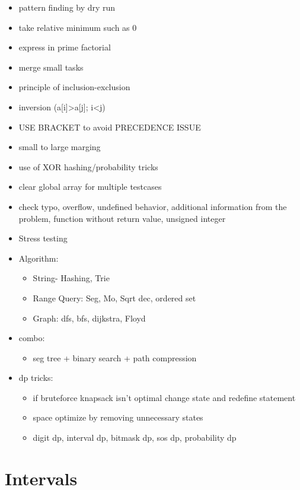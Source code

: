 \begin{itemize}
    \item pattern finding by dry run
    \item take relative minimum such as 0
    \item express in prime factorial
    \item merge small tasks 
    \item principle of inclusion-exclusion
    \item inversion (a[i]>a[j]; i<j)
    \item USE BRACKET to avoid PRECEDENCE ISSUE
    \item small to large marging
    \item use of XOR hashing/probability tricks
    \item clear global array for multiple testcases
    \item check typo, overflow, undefined behavior, additional information from the problem, function without return value, unsigned integer 
    \item Stress testing
    \item Algorithm:
    \begin{itemize}
        \item String- Hashing, Trie
        \item Range Query: Seg, Mo, Sqrt dec, ordered set
        \item Graph: dfs, bfs, dijkstra, Floyd
    \end{itemize}
    \item combo:
    \begin{itemize}
        \item seg tree + binary search + path compression
    \end{itemize}
    \item dp tricks:
    \begin{itemize}
        \item if bruteforce knapsack isn't optimal change state and redefine statement
        \item space optimize by removing unnecessary states
        \item digit dp, interval dp, bitmask dp, sos dp, probability dp
    \end{itemize}

\end{itemize}


\section{Intervals}


